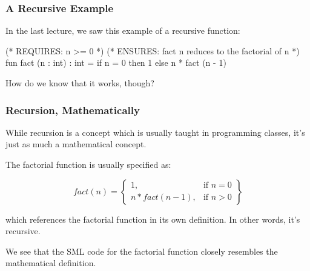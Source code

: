 \documentclass[aspectratio=169]{beamer}
\begin{document}
\begin{frame}[fragile]
  \frametitle{A Recursive Example}

  In the last lecture, we saw this example of a recursive function:

  \vspace{\fill}

  \begin{codeblock}
    (* REQUIRES: n >= 0 *)
    (* ENSURES: fact n reduces to the factorial of n *)
    fun fact (n : int) : int = 
      if n = 0 then 
        1
      else 
        n * fact (n - 1) 
  \end{codeblock}

  \vspace{\fill}

  How do we know that it works, though?
\end{frame}

\begin{frame}[fragile]
  \frametitle{Recursion, Mathematically}

  While recursion is a concept which is usually taught in programming classes, 
  it's just as much a mathematical concept.

  \vspace{\fill}

  The factorial function is usually specified as: 

  \vspace{5pt}

  \begin{equation}
    fact(n) = 
    \left\{
        \begin{array}{lr}
            1, & \text{if } n = 0\\
            n * fact(n - 1), & \text{if } n > 0
        \end{array}
    \right\}
  \end{equation}

  \vspace{5pt}

  which references the factorial function in its own definition. In other words, it's 
  recursive.

  \vspace{\fill}

  We see that the SML code for the factorial function closely resembles the mathematical
  definition. 
\end{frame}
\end{document}
